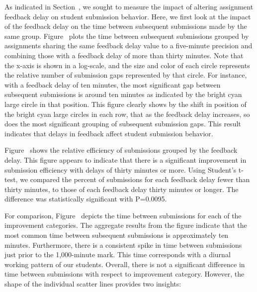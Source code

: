 As indicated in Section~, we sought to measure the impact
of altering assignment feedback delay on student submission behavior. Here, we
first look at the impact of the feedback delay on the time between subsequent
submissions made by the same group. Figure~ plots the
time between subsequent submissions grouped by assignments sharing the same
feedback delay value to a five-minute precision and combining those with a
feedback delay of more than thirty minutes. Note that the x-axis is shown in a
log-scale, and the size and color of each circle represents the relative number
of submission gaps represented by that circle. For instance, with a feedback
delay of ten minutes, the most significant gap between subsequent submissions
is around ten minutes as indicated by the bright cyan large circle in that
position. This figure clearly shows by the shift in position of the bright cyan
large circles in each row, that as the feedback delay increases, so does the
most significant grouping of subsequent submission gaps. This result indicates
that delays in feedback affect student submission behavior.

Figure~ shows the relative efficiency of
submissions grouped by the feedback delay. This figure appears to indicate that
there is a significant improvement in submission efficiency with delays of
thirty minutes or more. Using Student's t-test, we compared the percent of
\imp{} submissions for each feedback delay fewer than thirty minutes, to those
of each feedback delay thirty minutes or longer. The difference was
statistically significant with P=0.0095.

For comparison, Figure~ depicts the time between
submissions for each of the improvement categories. The aggregate results from
the figure indicate that the most common time between subsequent submissions is
approximately ten minutes. Furthermore, there is a consistent spike in time
between submissions just prior to the 1,000-minute mark. This time corresponds
with a diurnal working pattern of our students. Overall, there is not a
significant difference in time between submissions with respect to improvement
category. However, the shape of the individual scatter lines provides two
insights:

